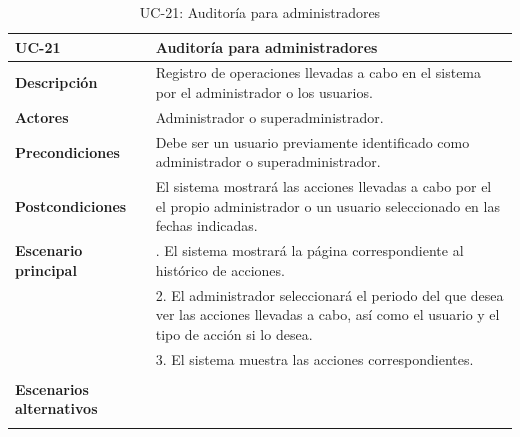 \begin{table}[H]
  \begin{center}
    \begin{tabularx}{16.4cm}{|l|X|}
      \hline
      \textbf{UC-21} & \textbf{Auditoría para administradores}\\
      \hline
      \textbf{Descripción} & Registro de operaciones llevadas a cabo en el sistema por el administrador o los usuarios.\\
      \hline
      \textbf{Actores} & Administrador o superadministrador.\\
      \hline
      \textbf{Precondiciones} & Debe ser un usuario previamente identificado como administrador o superadministrador.\\
      \hline
      \textbf{Postcondiciones} & El sistema mostrará las acciones llevadas a cabo por el el propio administrador o un usuario seleccionado en las fechas indicadas.\\
      \hline
      \textbf{Escenario principal} & \smallskip 1. El sistema mostrará la página correspondiente al histórico de acciones.\\
      & 2. El administrador seleccionará el periodo del que desea ver las acciones llevadas a cabo, así como el usuario y el tipo de acción si lo desea.\\
      & 3. El sistema muestra las acciones correspondientes.\\
      & \\
      \hline
      \textbf{Escenarios alternativos} & \\
      & \\
      \hline
    \end{tabularx}
    \caption{UC-21: Auditoría para administradores}
    \label{tab:CU-auditorias-admin}
  \end{center}
\end{table}


